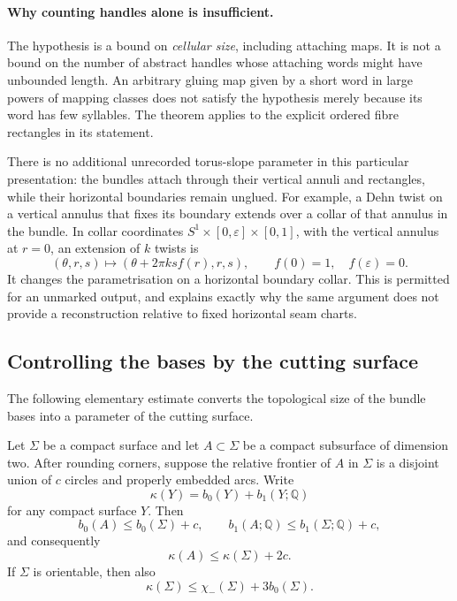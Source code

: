 \paragraph{Why counting handles alone is insufficient.}
The hypothesis is a bound on \emph{cellular size}, including attaching
maps.  It is not a bound on the number of abstract handles whose attaching
words might have unbounded length.  An arbitrary gluing map given by a short
word in large powers of mapping classes does not satisfy the hypothesis
merely because its word has few syllables.  The theorem applies to the
explicit ordered fibre rectangles in its statement.

There is no additional unrecorded torus-slope parameter in this particular
presentation: the bundles attach through their vertical annuli and
rectangles, while their horizontal boundaries remain unglued.  For example,
a Dehn twist on a vertical annulus that fixes its boundary extends over a
collar of that annulus in the bundle.  In collar coordinates
$S^1\times[0,\varepsilon]\times[0,1]$, with the vertical annulus at $r=0$,
an extension of $k$ twists is
\[
  (\theta,r,s)\longmapsto
  (\theta+2\pi k s f(r),r,s),
  \qquad f(0)=1,\quad f(\varepsilon)=0.
\]
It changes the parametrisation on a horizontal boundary collar.  This is
permitted for an unmarked output, and explains exactly why the same argument
does not provide a reconstruction relative to fixed horizontal seam charts.

\subsection{Controlling the bases by the cutting surface}

The following elementary estimate converts the topological size of the
bundle bases into a parameter of the cutting surface.

\begin{lemma}
\label{lem:subsurface-complexity}
Let $\Sigma$ be a compact surface and let $A\subset\Sigma$ be a compact
subsurface of dimension two.  After rounding corners, suppose the relative frontier of $A$
in $\Sigma$ is a disjoint union of $c$ circles and properly embedded arcs.
Write
\[
  \kappa(Y)=b_0(Y)+b_1(Y;\mathbb Q)
\]
for any compact surface $Y$.  Then
\[
  b_0(A)\leq b_0(\Sigma)+c,
  \qquad
  b_1(A;\mathbb Q)\leq b_1(\Sigma;\mathbb Q)+c,
\]
and consequently
\[
  \kappa(A)\leq\kappa(\Sigma)+2c.
\]
If $\Sigma$ is orientable, then also
\[
  \kappa(\Sigma)\leq\chi_-(\Sigma)+3b_0(\Sigma).
\]
\end{lemma}

